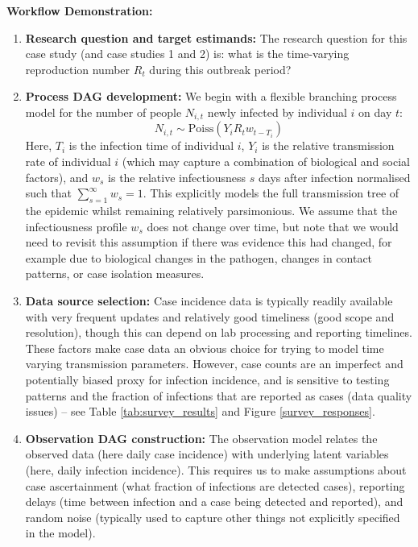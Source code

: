 \documentclass{article}
\begin{document}
\textbf{Workflow Demonstration:}
\begin{enumerate}
    \item \textbf{Research question and target estimands:} The research question for this case study (and case studies 1 and 2) is: what is the time-varying reproduction number $R_t$ during this outbreak period?

    \item \textbf{Process DAG development:} We begin with a flexible branching process model for the number of people $N_{i,t}$ newly infected by individual $i$ on day $t$:
    \begin{equation} \label{eq:individual_level}
         N_{i,t} \sim \mathrm{Poiss} \left( Y_i R_t w_{t-T_i} \right)
    \end{equation} 
    Here, $T_i$ is the infection time of individual $i$, $Y_i$ is the relative transmission rate of individual $i$ (which may capture a combination of biological and social factors), and $w_s$ is the relative infectiousness $s$ days after infection normalised such that $\sum_{s=1}^\infty w_s=1$. This explicitly models the full transmission tree of the epidemic whilst remaining relatively parsimonious. We assume that the infectiousness profile $w_s$ does not change over time, but note that we would need to revisit this assumption if there was evidence this had changed, for example due to biological changes in the pathogen, changes in contact patterns, or case isolation measures.
    

\item \textbf{Data source selection:} Case incidence data is typically readily available with very frequent updates and relatively good timeliness (good scope and resolution), though this can depend on lab processing and reporting timelines. These factors make case data an obvious choice for trying to model time varying transmission parameters. However, case counts are an imperfect and potentially biased proxy for infection incidence, and is sensitive to testing patterns and the fraction of infections that are reported as cases (data quality issues) -- see Table \ref{tab:survey_results} and Figure \ref{survey_responses}. 


\item \textbf{Observation DAG construction:} The observation model relates the observed data (here daily case incidence) with underlying latent variables (here, daily infection incidence). 
This requires us to make assumptions about case ascertainment (what fraction of infections are detected cases), reporting delays (time between infection and a case being detected and reported), and random noise (typically used to capture other things not explicitly specified in the model).


\end{enumerate}
\end{document}
